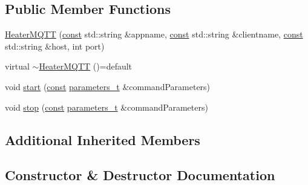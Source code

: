 \subsection*{Public Member Functions}
\begin{DoxyCompactItemize}
\item 
\hyperlink{class_heater_m_q_t_t_aab2a6e6a1e3eae626e867ff671b71a0e}{Heater\+M\+Q\+TT} (\hyperlink{functions__c_8js_afacfd9c985d225bb07483b887a801b6f}{const} std\+::string \&appname, \hyperlink{functions__c_8js_afacfd9c985d225bb07483b887a801b6f}{const} std\+::string \&clientname, \hyperlink{functions__c_8js_afacfd9c985d225bb07483b887a801b6f}{const} std\+::string \&host, int port)
\item 
virtual \hyperlink{class_heater_m_q_t_t_a37bc998256f9d5161c7d032e9bc9d16c}{$\sim$\+Heater\+M\+Q\+TT} ()=default
\item 
void \hyperlink{class_heater_m_q_t_t_a9903c8c0e1c4a5cd26cd75c484a4f4a6}{start} (\hyperlink{functions__c_8js_afacfd9c985d225bb07483b887a801b6f}{const} \hyperlink{_heater_m_q_t_t_8h_ad3b3bd6544a775cf1e31cd71610c5765}{parameters\+\_\+t} \&command\+Parameters)
\item 
void \hyperlink{class_heater_m_q_t_t_a90248f98e4548768bd65b5aff38fafee}{stop} (\hyperlink{functions__c_8js_afacfd9c985d225bb07483b887a801b6f}{const} \hyperlink{_heater_m_q_t_t_8h_ad3b3bd6544a775cf1e31cd71610c5765}{parameters\+\_\+t} \&command\+Parameters)
\end{DoxyCompactItemize}
\subsection*{Additional Inherited Members}


\subsection{Constructor \& Destructor Documentation}

